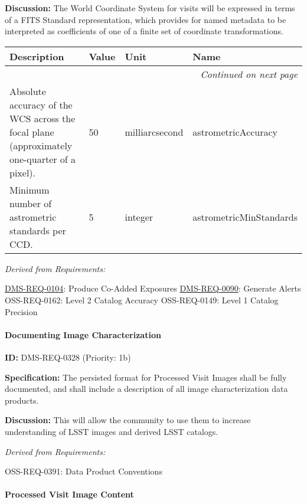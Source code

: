 \documentclass[SE,toc,lsstdraft]{lsstdoc}
\makeatletter
\newcommand{\paramname}[1]{\hspace{0pt}#1}
\newcommand{\unitname}[1]{\hspace{0pt}#1}
\newenvironment{parameters}[0]{%
\setlength\LTleft{0pt}
\setlength\LTright{\fill}
\begin{small}
\begin{longtable}[]{|p{0.49\textwidth}|l|p{0.6in}|p{1.70in}@{}|}

\hline \textbf{Description} & \textbf{Value} & \textbf{Unit} & \textbf{Name} \\ \hline
\endhead

\hline \multicolumn{4}{r}{\emph{Continued on next page}} \\
\endfoot

\hline\hline
\endlastfoot
}{%
\hline
\end{longtable}
\end{small}
}
\makeatother
\begin{document}
\textbf{Discussion:} The World Coordinate System for visits will be expressed in terms of a FITS Standard representation, which provides for named metadata to be interpreted as coefficients of one of a finite set of coordinate transformations.

\begin{parameters}
Absolute accuracy of the WCS across the focal plane (approximately one-quarter of a pixel).
&
50
&
\unitname{%
milliarcsecond
}
&
\paramname{%
astrometricAccuracy
} \\\hline
Minimum number of astrometric standards per CCD.
&
5
&
\unitname{%
integer
}
&
\paramname{%
astrometricMinStandards
} \\\hline
\end{parameters}

\emph{Derived from Requirements:}

\hyperref[DMS-REQ-0104]{DMS-REQ-0104}:
Produce Co-Added Exposures \newline
\hyperref[DMS-REQ-0090]{DMS-REQ-0090}:
Generate Alerts \newline
OSS-REQ-0162:
Level 2 Catalog Accuracy \newline
OSS-REQ-0149:
Level 1 Catalog Precision \newline

\paragraph{Documenting Image Characterization}\hfill  %

\label{DMS-REQ-0328}
\textbf{ID:} DMS-REQ-0328 (Priority: 1b)

\textbf{Specification:} The persisted format for Processed Visit Images shall be fully documented, and shall include a description of all image characterization data products.

\textbf{Discussion:} This will allow the community to use them to increase understanding of LSST images and derived LSST catalogs.

\emph{Derived from Requirements:}

OSS-REQ-0391:
Data Product Conventions \newline

\paragraph{Processed Visit Image Content}\hfill  %
\end{document}
